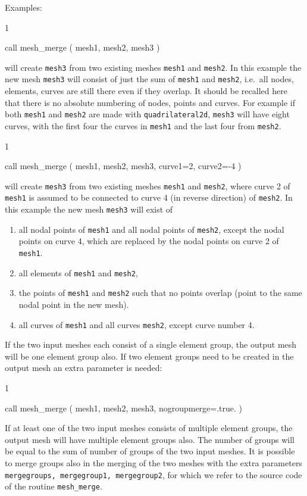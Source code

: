 Examples:
\begin{listing}{1}

  call mesh_merge ( mesh1, mesh2, mesh3 ) 

\end{listing}
will create \texttt{mesh3} from two existing meshes \texttt{mesh1} and
\texttt{mesh2}. In this example the new mesh \texttt{mesh3}
will consist of just the sum of \texttt{mesh1} and \texttt{mesh2}, i.e.\ all
nodes, elements, curves are still there even if they overlap.
It should be
recalled here that there is no absolute numbering of nodes, points and curves.
For example if both \texttt{mesh1} and \texttt{mesh2}
are made with \texttt{quadrilateral2d}, \texttt{mesh3} will have eight curves,
with the first four the curves in \texttt{mesh1} and the last four from
\texttt{mesh2}.
\begin{listing}{1}

  call mesh_merge ( mesh1, mesh2, mesh3, curve1=2, curve2=-4 ) 

\end{listing}
will create \texttt{mesh3} from two existing meshes \texttt{mesh1} and
\texttt{mesh2}, where curve 2 of \texttt{mesh1} is assumed to be connected to
curve 4 (in reverse direction) of \texttt{mesh2}.
In this example the new mesh \texttt{mesh3} will exist of
\begin{enumerate}
 \item all nodal points of \texttt{mesh1} and all nodal points of
        \texttt{mesh2}, except the nodal points on curve 4, which are replaced
       by the nodal points on curve 2 of \texttt{mesh1}.
 \item all elements of \texttt{mesh1} and \texttt{mesh2},  
 \item the points of \texttt{mesh1} and \texttt{mesh2} such that no points
       overlap (point to the same nodal point in the new mesh).
 \item all curves of \texttt{mesh1} and all curves \texttt{mesh2}, except curve
       number 4.
\end{enumerate}
If the two input meshes each consist of a single element group, the output mesh
will be one element group also. If two element groups need to be created in the
output mesh an extra parameter is needed:
\begin{listing}{1}

  call mesh_merge ( mesh1, mesh2, mesh3, nogroupmerge=.true. )

\end{listing}
If at least one of the two input meshes consists of multiple
element groups, the output mesh will have multiple element groups also. The
number of groups will be equal to the sum of number of groups of
the two input meshes.
It is possible to merge groups also in the merging of the two meshes with
the extra parameters \texttt{mergegroups, mergegroup1, mergegroup2}, for which
we refer to the source code of the routine \texttt{mesh\_merge}.

